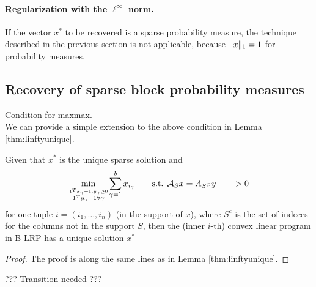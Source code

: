 \documentclass{article} %
\begin{document}
\paragraph{Regularization with the $\ell^\infty$ norm.} If the vector $x^*$ to be recovered is a sparse probability measure, the technique described in the previous section is not applicable, because $\lVert x\rVert_1 = 1$ for probability measures.





\subsection{Recovery of sparse block probability measures}

Condition for maxmax.\\ 

We can provide a simple extension to the above condition in Lemma \ref{thm:linftyunique}.
\begin{lemma} \label{thm:linftyunique_block}
Given that $x^*$ is the unique sparse solution and 
\begin{equation*}
\min_{\overset{1^Tx_{\gamma} = 1, y_{\gamma} \geq 0}{1^Ty_{\gamma} =1 \forall \gamma}} \sum_{\gamma =1}^b x_{i_{\gamma}} \qquad \text{s.t. } \mathcal{A}_S x = A_{S^C} y \qquad>0
\end{equation*}
for one tuple $i = (i_1, \dots, i_n)$ (in the support of $x$), where $S^c$ is the set of indeces for the columns not in the support $S$, then the (inner $i$-th) convex linear program in B-LRP has a unique solution $x^*$
\end{lemma}
\begin{proof}
The proof is along the same lines as in Lemma \ref{thm:linftyunique}.
\end{proof}

??? Transition needed ???
\end{document}
